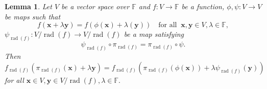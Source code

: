 \documentclass{elsarticle}
\DeclareMathOperator{\rad}{rad}
\def\F{{\mathbb F}}
\newtheorem{lemma}[theorem]{Lemma}
\theoremstyle{definition}
\numberwithin{equation}{section}
\begin{document}
\begin{lemma}\label{lem:TwoCondLift}
Let $V$ be a vector space over $\F$ and $f\colon V \to \F$ be a function, $\phi, \psi \colon V \to V$ be maps such that
\begin{equation}\label{lem:TwoCondLift:eqq1}
f(\mathbf x + \lambda \mathbf y) = f(\phi(\mathbf x) + \lambda (\mathbf y))\quad\mbox{for all}\;\;\mathbf x, \mathbf y \in V, \lambda \in \F,
\end{equation}
$\psi_{\rad(f)}\colon V/\rad(f) \to V/\rad(f)$ be a map satisfying
\begin{equation}\label{lem:TwoCondLift:eqq2}
\psi_{\rad(f)} \circ \pi_{\rad(f)} = \pi_{\rad(f)} \circ \psi. 
\end{equation}
Then
\begin{equation*}\label{lem:TwoCondLift:eqq3}
f_{\rad(f)}(\pi_{\rad(f)}(\mathbf x) + \lambda \mathbf y) = f_{\rad(f)}(\pi_{\rad(f)}(\phi(\mathbf x)) + \lambda \psi_{\rad(f)}(\mathbf y))
\end{equation*}
for all $\mathbf x \in V, \mathbf y \in V/\rad(f), \lambda \in \F.$
\end{lemma}
\end{document}
